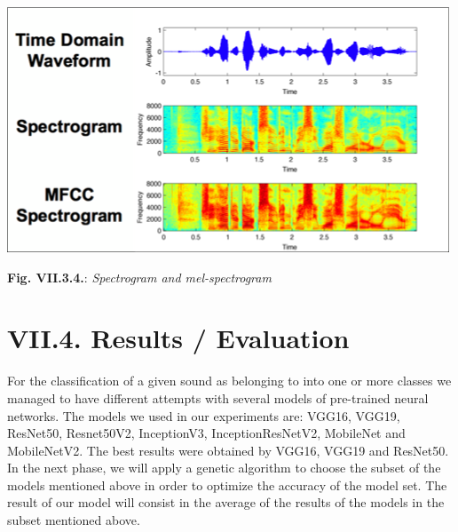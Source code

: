 \documentclass[11pt, a4papper]{report}
\theoremstyle{plain}
\theoremstyle{definition}
\theoremstyle{definition}
\theoremstyle{proposition}
\begin{document}
\begin{center}
\includegraphics[scale=0.8]{sound-representation.png}
\end{center}
\begin{center}
\textbf{Fig. VII.3.4.}: \textit{Spectrogram and mel-spectrogram}
\end{center}

\section*{VII.4. Results /  Evaluation}

For the classification of a given sound as belonging to into one or more classes we managed to have different attempts with several models of pre-trained neural networks. The models we used in our experiments are: VGG16, VGG19, ResNet50, Resnet50V2, InceptionV3, InceptionResNetV2, MobileNet and MobileNetV2. The best results were obtained by VGG16, VGG19 and ResNet50. In the next phase, we will apply a genetic algorithm to choose the subset of the models mentioned above in order to optimize the accuracy of the model set. The result of our model will consist in the average of the results of the models in the subset mentioned above.
\\
\end{document}
